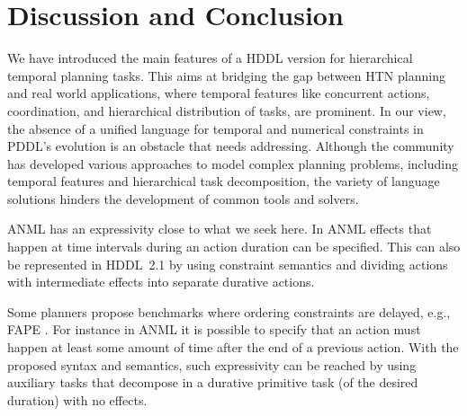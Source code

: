 \documentclass[letterpaper]{article} %
\begin{document}
\section{Discussion and Conclusion}
\label{sec:conclusion}


We have introduced the main features of a HDDL version  for hierarchical temporal planning tasks.
This aims at bridging the gap between HTN planning and real world applications, where temporal features like concurrent actions, coordination, and hierarchical distribution of tasks, are prominent.
%
In our view, the absence of a unified language for temporal and numerical constraints in PDDL's evolution is an obstacle that  needs addressing. Although the community has developed various approaches to model complex planning problems, including temporal features and hierarchical task decomposition, the variety of language solutions hinders the development of common tools and solvers.


ANML  \citep{smith08} has an expressivity close to what we seek here.
In ANML effects that happen at time intervals during an action duration can be specified. This  can also be represented in HDDL~2.1 by using constraint semantics and dividing actions with intermediate effects into separate durative actions.

Some planners propose benchmarks where ordering constraints are delayed, e.g., FAPE \cite{dvorak2014}. %
 For instance in ANML it is possible to specify that an action must happen at least some amount of time after the end of a previous action. With the proposed syntax and semantics, such expressivity can be reached by using auxiliary tasks that decompose in a durative primitive task (of the desired duration) with no effects. %
\end{document}
